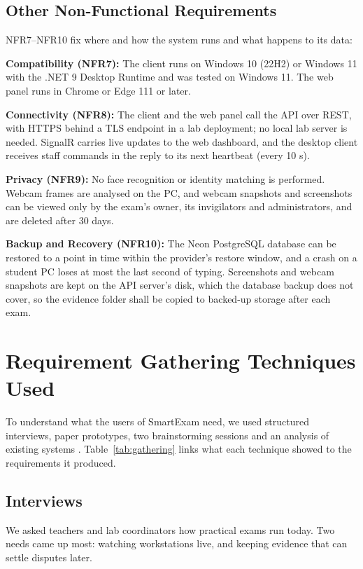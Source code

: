 \subsection{Other Non-Functional Requirements}
\label{sec:othernfr}
NFR7--NFR10 fix where and how the system runs and what happens to its data:

\textbf{Compatibility (NFR7):} The client runs on Windows 10 (22H2) or Windows 11 with the .NET 9 Desktop Runtime and was tested on Windows 11. The web panel runs in Chrome or Edge 111 or later.

\textbf{Connectivity (NFR8):} The client and the web panel call the API over REST, with HTTPS behind a TLS endpoint in a lab deployment; no local lab server is needed. SignalR carries live updates to the web dashboard, and the desktop client receives staff commands in the reply to its next heartbeat (every 10 s).

\textbf{Privacy (NFR9):} No face recognition or identity matching is performed. Webcam frames are analysed on the PC, and webcam snapshots and screenshots can be viewed only by the exam's owner, its invigilators and administrators, and are deleted after 30 days.

\textbf{Backup and Recovery (NFR10):} The Neon PostgreSQL database can be restored to a point in time within the provider's restore window, and a crash on a student PC loses at most the last second of typing. Screenshots and webcam snapshots are kept on the API server's disk, which the database backup does not cover, so the evidence folder shall be copied to backed-up storage after each exam.

\section{Requirement Gathering Techniques Used}
\label{sec:gathering}
To understand what the users of SmartExam need, we used structured interviews, paper prototypes, two brainstorming sessions and an analysis of existing systems \cite{elicit1, sommerville}. Table~\ref{tab:gathering} links what each technique showed to the requirements it produced.

\subsection{Interviews}
We asked teachers and lab coordinators how practical exams run today. Two needs came up most: watching workstations live, and keeping evidence that can settle disputes later.

